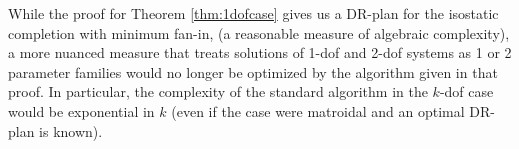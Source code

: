 \begin{remark}
\label{obs:algebraic_completion}
    While the proof for Theorem \ref{thm:1dofcase} gives us a DR-plan for the isostatic completion with minimum fan-in, (a reasonable measure of algebraic complexity), a more nuanced measure that treats solutions of 1-dof and 2-dof systems as 1 or 2 parameter families would no longer be optimized by the algorithm given in that proof. In particular, the complexity of the standard algorithm in the $k$-dof case would be exponential in $k$ (even if the case were matroidal and an optimal DR-plan is known).
\end{remark}





